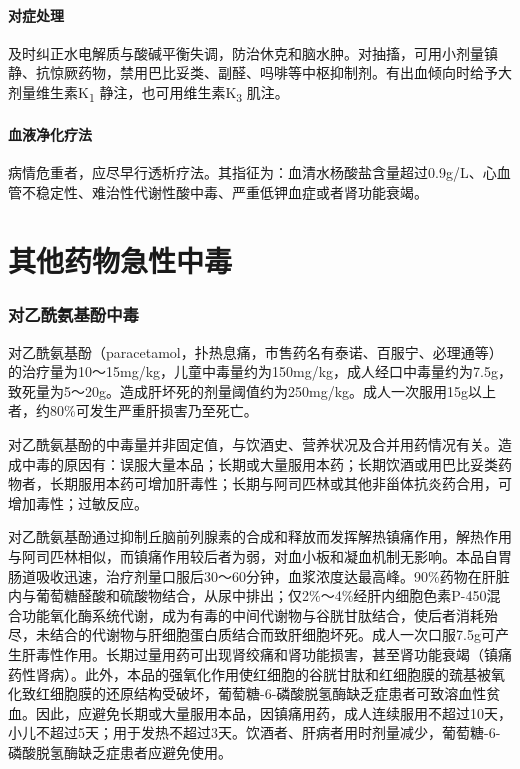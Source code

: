 \paragraph{对症处理}

及时纠正水电解质与酸碱平衡失调，防治休克和脑水肿。对抽搐，可用小剂量镇静、抗惊厥药物，禁用巴比妥类、副醛、吗啡等中枢抑制剂。有出血倾向时给予大剂量维生素K\textsubscript{1}
静注，也可用维生素K\textsubscript{3} 肌注。

\paragraph{血液净化疗法}

病情危重者，应尽早行透析疗法。其指征为：血清水杨酸盐含量超过0.9g/L、心血管不稳定性、难治性代谢性酸中毒、严重低钾血症或者肾功能衰竭。

\protect\hypertarget{text00137.html}{}{}

\section{其他药物急性中毒}

\subsubsection{对乙酰氨基酚中毒}

对乙酰氨基酚（paracetamol，扑热息痛，市售药名有泰诺、百服宁、必理通等）的治疗量为10～15mg/kg，儿童中毒量约为150mg/kg，成人经口中毒量约为7.5g，致死量为5～20g。造成肝坏死的剂量阈值约为250mg/kg。成人一次服用15g以上者，约80\%可发生严重肝损害乃至死亡。

对乙酰氨基酚的中毒量并非固定值，与饮酒史、营养状况及合并用药情况有关。造成中毒的原因有：误服大量本品；长期或大量服用本药；长期饮酒或用巴比妥类药物者，长期服用本药可增加肝毒性；长期与阿司匹林或其他非甾体抗炎药合用，可增加毒性；过敏反应。

对乙酰氨基酚通过抑制丘脑前列腺素的合成和释放而发挥解热镇痛作用，解热作用与阿司匹林相似，而镇痛作用较后者为弱，对血小板和凝血机制无影响。本品自胃肠道吸收迅速，治疗剂量口服后30～60分钟，血浆浓度达最高峰。90\%药物在肝脏内与葡萄糖醛酸和硫酸物结合，从尿中排出；仅2\%～4\%经肝内细胞色素P-450混合功能氧化酶系统代谢，成为有毒的中间代谢物与谷胱甘肽结合，使后者消耗殆尽，未结合的代谢物与肝细胞蛋白质结合而致肝细胞坏死。成人一次口服7.5g可产生肝毒性作用。长期过量用药可出现肾绞痛和肾功能损害，甚至肾功能衰竭（镇痛药性肾病）。此外，本品的强氧化作用使红细胞的谷胱甘肽和红细胞膜的巯基被氧化致红细胞膜的还原结构受破坏，葡萄糖-6-磷酸脱氢酶缺乏症患者可致溶血性贫血。因此，应避免长期或大量服用本品，因镇痛用药，成人连续服用不超过10天，小儿不超过5天；用于发热不超过3天。饮酒者、肝病者用时剂量减少，葡萄糖-6-磷酸脱氢酶缺乏症患者应避免使用。

